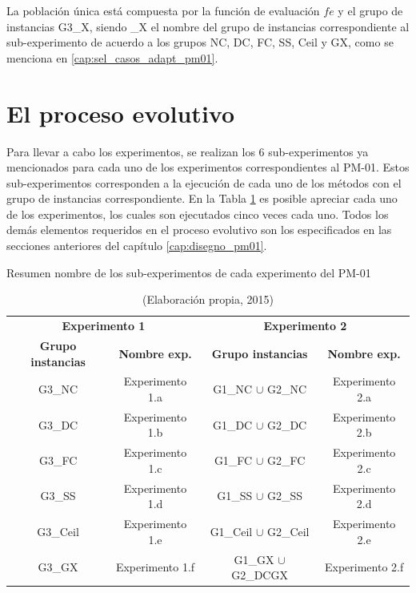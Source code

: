 La población única está compuesta por la función de evaluación $fe$ y el grupo de instancias G3\_X, siendo \_X el nombre del grupo de instancias correspondiente al sub-experimento de acuerdo a los grupos NC, DC, FC, SS, Ceil y GX, como se menciona en \ref{cap:sel_casos_adapt_pm01}.

\section{El proceso evolutivo}

Para llevar a cabo los experimentos, se realizan los 6 sub-experimentos ya mencionados para cada uno de los experimentos correspondientes al PM-01. Estos sub-experimentos corresponden a la ejecución de cada uno de los métodos con el grupo de instancias correspondiente. En la Tabla \ref{tab:resumen_exp} es posible apreciar cada uno de los experimentos, los cuales son ejecutados cinco veces cada uno. Todos los demás elementos requeridos en el proceso evolutivo son los especificados en las secciones anteriores del capítulo \ref{cap:disegno_pm01}.

\begin{table}[hbtp!]
\caption{Resumen nombre de los sub-experimentos de cada experimento del PM-01}\label{tab:resumen_exp}
\small
\centering
\begin{center}
\begin{tabular}{cc||cc}
\hline
\multicolumn{2}{c||}{{\textbf{Experimento 1}}} & \multicolumn{2}{c}{{\textbf{Experimento 2}}} \\
{\textbf{Grupo instancias}} & {\textbf{Nombre exp.}} & {\textbf{Grupo instancias}} & {\textbf{Nombre exp.}} \\ \hline
G3\_NC   & Experimento 1.a & G1\_NC $\cup$ G2\_NC 		& Experimento 2.a \\
G3\_DC   & Experimento 1.b & G1\_DC $\cup$ G2\_DC 		& Experimento 2.b \\
G3\_FC   & Experimento 1.c & G1\_FC $\cup$ G2\_FC 		& Experimento 2.c \\
G3\_SS   & Experimento 1.d & G1\_SS $\cup$ G2\_SS 		& Experimento 2.d \\
G3\_Ceil & Experimento 1.e & G1\_Ceil $\cup$ G2\_Ceil 	& Experimento 2.e \\
G3\_GX   & Experimento 1.f & G1\_GX $\cup$ G2\_DCGX 	& Experimento 2.f \\
\hline
\end{tabular}
\end{center}
\caption*{(Elaboración propia, 2015)}
\end{table}
